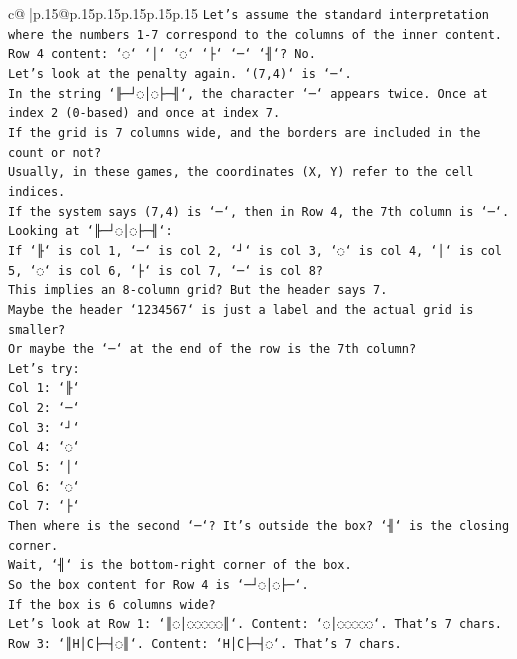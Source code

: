 \documentclass{article}
\begin{document}
{\begin{supertabular}{c@{$\;$}|p{.15\linewidth}@{}p{.15\linewidth}p{.15\linewidth}p{.15\linewidth}p{.15\linewidth}p{.15\linewidth}}
{{{\texttt{Let's assume the standard interpretation where the numbers 1{-}7 correspond to the columns of the inner content.} \\
\texttt{Row 4 content: `◌` `│` `◌` `├` `─` `╢`? No.} \\
\texttt{Let's look at the penalty again. `(7,4)` is `─`.} \\
\texttt{In the string `╟─┘◌│◌├─╢`, the character `─` appears twice. Once at index 2 (0{-}based) and once at index 7.} \\
\texttt{If the grid is 7 columns wide, and the borders are included in the count or not?} \\
\texttt{Usually, in these games, the coordinates (X, Y) refer to the cell indices.} \\
\texttt{If the system says (7,4) is `─`, then in Row 4, the 7th column is `─`.} \\
\texttt{Looking at `╟─┘◌│◌├─╢`:} \\
\texttt{If `╟` is col 1, `─` is col 2, `┘` is col 3, `◌` is col 4, `│` is col 5, `◌` is col 6, `├` is col 7, `─` is col 8?} \\
\texttt{This implies an 8{-}column grid? But the header says 7.} \\
\texttt{Maybe the header `1234567` is just a label and the actual grid is smaller?} \\
\texttt{Or maybe the `─` at the end of the row is the 7th column?} \\
\texttt{Let's try:} \\
\texttt{Col 1: `╟`} \\
\texttt{Col 2: `─`} \\
\texttt{Col 3: `┘`} \\
\texttt{Col 4: `◌`} \\
\texttt{Col 5: `│`} \\
\texttt{Col 6: `◌`} \\
\texttt{Col 7: `├`} \\
\texttt{Then where is the second `─`? It's outside the box? `╢` is the closing corner.} \\
\texttt{Wait, `╢` is the bottom{-}right corner of the box.} \\
\texttt{So the box content for Row 4 is `─┘◌│◌├─`.} \\
\texttt{If the box is 6 columns wide?} \\
\texttt{Let's look at Row 1: `║◌│◌◌◌◌◌║`. Content: `◌│◌◌◌◌◌`. That's 7 chars.} \\
\texttt{Row 3: `║H│C├─┤◌║`. Content: `H│C├─┤◌`. That's 7 chars.} \\
}}}
\end{supertabular}}
\end{document}
